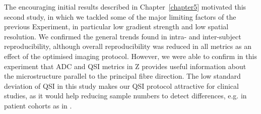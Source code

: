 The encouraging initial results described in Chapter~\ref{chapter5} motivated this second study, in which we tackled some of the major limiting factors of the previous Experiment, in particular low gradient strength and low spatial resolution. We confirmed the general trends found in intra- and inter-subject reproducibility, although overall reproducibility was reduced in all metrics as an effect of the optimised imaging protocol. However, we were able to confirm in this experiment that ADC and QSI metrics in Z provides useful information about the microstructure parallel to the principal fibre direction. The low standard deviation of QSI in this study makes our QSI protocol attractive for clinical studies, as it would help reducing sample numbers to detect differences, e.g. in patient cohorts as in \citep{Farrell:2008}.



